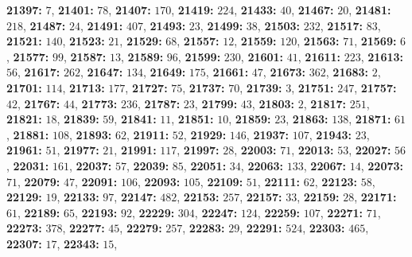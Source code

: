 \textsf{\bfseries 21397:} $7$, \textsf{\bfseries 21401:} $78$, \textsf{\bfseries 21407:} $170$, \textsf{\bfseries 21419:} $224$, \textsf{\bfseries 21433:} $40$, \textsf{\bfseries 21467:} $20$, \textsf{\bfseries 21481:} $218$, \textsf{\bfseries 21487:} $24$, \textsf{\bfseries 21491:} $407$, \textsf{\bfseries 21493:} $23$, \textsf{\bfseries 21499:} $38$, \textsf{\bfseries 21503:} $232$, \textsf{\bfseries 21517:} $83$, \textsf{\bfseries 21521:} $140$, \textsf{\bfseries 21523:} $21$, \textsf{\bfseries 21529:} $68$, \textsf{\bfseries 21557:} $12$, \textsf{\bfseries 21559:} $120$, \textsf{\bfseries 21563:} $71$, \textsf{\bfseries 21569:} $6$, \textsf{\bfseries 21577:} $99$, \textsf{\bfseries 21587:} $13$, \textsf{\bfseries 21589:} $96$, \textsf{\bfseries 21599:} $230$, \textsf{\bfseries 21601:} $41$, \textsf{\bfseries 21611:} $223$, \textsf{\bfseries 21613:} $56$, \textsf{\bfseries 21617:} $262$, \textsf{\bfseries 21647:} $134$, \textsf{\bfseries 21649:} $175$, \textsf{\bfseries 21661:} $47$, \textsf{\bfseries 21673:} $362$, \textsf{\bfseries 21683:} $2$, \textsf{\bfseries 21701:} $114$, \textsf{\bfseries 21713:} $177$, \textsf{\bfseries 21727:} $75$, \textsf{\bfseries 21737:} $70$, \textsf{\bfseries 21739:} $3$, \textsf{\bfseries 21751:} $247$, \textsf{\bfseries 21757:} $42$, \textsf{\bfseries 21767:} $44$, \textsf{\bfseries 21773:} $236$, \textsf{\bfseries 21787:} $23$, \textsf{\bfseries 21799:} $43$, \textsf{\bfseries 21803:} $2$, \textsf{\bfseries 21817:} $251$, \textsf{\bfseries 21821:} $18$, \textsf{\bfseries 21839:} $59$, \textsf{\bfseries 21841:} $11$, \textsf{\bfseries 21851:} $10$, \textsf{\bfseries 21859:} $23$, \textsf{\bfseries 21863:} $138$, \textsf{\bfseries 21871:} $61$, \textsf{\bfseries 21881:} $108$, \textsf{\bfseries 21893:} $62$, \textsf{\bfseries 21911:} $52$, \textsf{\bfseries 21929:} $146$, \textsf{\bfseries 21937:} $107$, \textsf{\bfseries 21943:} $23$, \textsf{\bfseries 21961:} $51$, \textsf{\bfseries 21977:} $21$, \textsf{\bfseries 21991:} $117$, \textsf{\bfseries 21997:} $28$, \textsf{\bfseries 22003:} $71$, \textsf{\bfseries 22013:} $53$, \textsf{\bfseries 22027:} $56$, \textsf{\bfseries 22031:} $161$, \textsf{\bfseries 22037:} $57$, \textsf{\bfseries 22039:} $85$, \textsf{\bfseries 22051:} $34$, \textsf{\bfseries 22063:} $133$, \textsf{\bfseries 22067:} $14$, \textsf{\bfseries 22073:} $71$, \textsf{\bfseries 22079:} $47$, \textsf{\bfseries 22091:} $106$, \textsf{\bfseries 22093:} $105$, \textsf{\bfseries 22109:} $51$, \textsf{\bfseries 22111:} $62$, \textsf{\bfseries 22123:} $58$, \textsf{\bfseries 22129:} $19$, \textsf{\bfseries 22133:} $97$, \textsf{\bfseries 22147:} $482$, \textsf{\bfseries 22153:} $257$, \textsf{\bfseries 22157:} $33$, \textsf{\bfseries 22159:} $28$, \textsf{\bfseries 22171:} $61$, \textsf{\bfseries 22189:} $65$, \textsf{\bfseries 22193:} $92$, \textsf{\bfseries 22229:} $304$, \textsf{\bfseries 22247:} $124$, \textsf{\bfseries 22259:} $107$, \textsf{\bfseries 22271:} $71$, \textsf{\bfseries 22273:} $378$, \textsf{\bfseries 22277:} $45$, \textsf{\bfseries 22279:} $257$, \textsf{\bfseries 22283:} $29$, \textsf{\bfseries 22291:} $524$, \textsf{\bfseries 22303:} $465$, \textsf{\bfseries 22307:} $17$, \textsf{\bfseries 22343:} $15$, 
